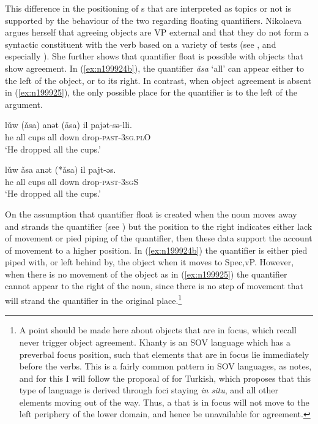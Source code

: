 \documentclass[output=paper
,modfonts
,nonflat]{langsci/langscibook}
\begin{document}
\noindent This difference in the positioning of \theme s that are interpreted as topics or not is supported by the behaviour of the two regarding floating quantifiers. Nikolaeva argues herself that agreeing objects are VP external and that they do not form a syntactic constituent with the verb based on a variety of tests (see \citealt{nikolaeva1999}, and especially \citealt[][67-69]{ostyakgrammar}). She further shows that quantifier float is possible with objects that show agreement. 
In (\ref{ex:n199924b}), the quantifier \emph{\v{a}sa} `all' can appear either to the left of the object, or to its right. In contrast, when object agreement is absent in (\ref{ex:n199925}), the only possible place for the quantifier is to the left of the argument.
\begin{exe}
\ex \citet[][345]{nikolaeva1999}
\begin{xlist}
\ex 
{\gll l\v{u}w (\v{a}sa) anət (\v{a}sa) il pajət-sə-lli.\\
he all cups all down drop-\textsc{past-3sg.plO}\\
\glt `He dropped all the cups.'} \label{ex:n199924b}

\ex 
{\gll l\v{u}w \v{a}sa anət (*\v{a}sa) il pajt-əs.\\
he all cups all down drop-\textsc{past-3sgS}\\
\glt `He dropped all the cups.'} \label{ex:n199925}
\end{xlist}
\end{exe}

\noindent On the assumption that quantifier float is created when the noun moves away and strands the quantifier (see \citealt{sportiche1988,mccloskey2000,boskovic2004b}) but the position to the right indicates either lack of movement or pied piping of the quantifier, then these data support the account of movement to a higher position. 
In (\ref{ex:n199924b}) the quantifier is either pied piped with, or left behind by, the object when it moves to Spec,vP. However, when there is no movement of the object as in (\ref{ex:n199925}) the quantifier cannot appear to the right of the noun, since there is no step of movement that will strand the quantifier in the original place.\footnote{A point should be made here about \theme{} objects that are in focus, which recall never trigger object agreement.  Khanty is an SOV language which has a preverbal focus position, such that elements that are in focus lie immediately before the verbs. 
This is a fairly common pattern in SOV languages, as \citet{nikolaeva1999} notes, and for this I will follow the proposal of \citet{sener2010} for Turkish, which \citeauthor{sener2010} proposes that this type of language is derived through foci staying \emph{in situ}, and all other elements moving out of the way.
Thus, a \theme{} that is in focus will not move to the left periphery of the lower domain, and hence be unavailable for agreement.}
\end{document}
